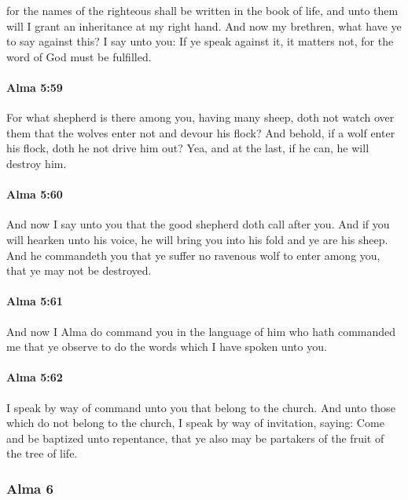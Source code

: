 			for the names of the righteous shall be written in the book of life,
			and unto them will I grant an inheritance at my right hand.
			And now my brethren, what have ye to say against this?
			I say unto you:
			If ye speak against it, it matters not,
			for the word of God must be fulfilled.

		\paragraph{Alma 5:59} %
			\label{ALMA-5-59}

			For what shepherd is there among you, having many sheep,
			doth not watch over them
			that the wolves enter not and devour his flock?
			And behold, if a wolf enter his flock,
			doth he not drive him out?
			Yea, and at the last, if he can, he will destroy him.

		\paragraph{Alma 5:60} %
			\label{ALMA-5-60}

			And now I say unto you
			that the good shepherd doth call after you.
			And if you will hearken unto his voice,
			he will bring you into his fold and ye are his sheep.
			And he commandeth you that ye suffer no ravenous wolf to enter among you,
			that ye may not be destroyed.

		\paragraph{Alma 5:61} %
			\label{ALMA-5-61}

			And now I Alma do command you
			in the language of him who hath commanded me
			that ye observe to do the words which I have spoken unto you.

		\paragraph{Alma 5:62} %
			\label{ALMA-5-62}

			I speak by way of command unto you that belong to the church.
			And unto those which do not belong to the church,
			I speak by way of invitation, saying:
			Come and be baptized unto repentance,
			that ye also may be partakers of the fruit of the tree of life.

	\subsubsection{Alma 6} %
		\label{ALMA-6}
		
